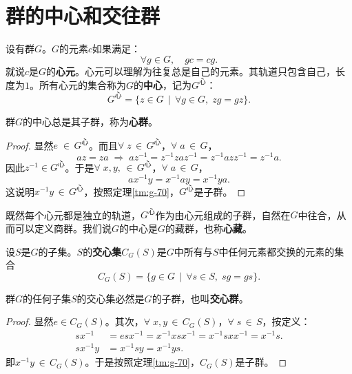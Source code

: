 \documentclass[12pt,UTF8,fontset=none]{ctexbook}
\begin{document}
\section{群的中心和交往群}

设有群$G$。$G$的元素$c$如果满足：
$$ \forall g\in G, \quad gc = cg.$$
就说$c$是$G$的\textbf{心元}。心元可以理解为往复总是自己的元素。其轨道只包含自己，长度为$1$。所有心元的集合称为$G$的\textbf{中心}，记为$G^{\text{心}}$：
$$ G^{\text{心}} = \{z\in G \, \mid \, \forall g\in G, \; zg = gz\}.$$

\begin{tm}\label{tm:g-150}
    群$G$的中心总是其子群，称为\textbf{心群}。
\end{tm}
\begin{proof}
    显然$e\;\in\,G^{\text{心}}$。而且$\forall \; z \,\in\, G^{\text{心}}$，$\forall\; a\,\in\, G$，
    $$ az = za \; \Rightarrow \;az^{-1} = z^{-1}zaz^{-1} = z^{-1}azz^{-1} = z^{-1}a. $$
    因此$z^{-1}\in G^{\text{心}}$。于是$\forall \; x, y,\,\in\, G^{\text{心}}$，$\forall\; a\,\in\, G$，
    $$ ax^{-1}y = x^{-1}ay = x^{-1}ya. $$
    这说明$x^{-1}y \,\in \, G^{\text{心}}$，按照定理\ref{tm:g-70}，$G^{\text{心}}$是子群。
\end{proof}

既然每个心元都是独立的轨道，$G^{\text{心}}$作为由心元组成的子群，自然在$G$中往合，从而可以定义商群。我们说$G$的中心是$G$的藏群，也称\textbf{心藏}。

\begin{df}
    设$S$是$G$的子集。$S$的\textbf{交心集}$C_G(S)$是$G$中所有与$S$中任何元素都交换的元素的集合
    $$ C_G(S) = \{g\in G \, \mid \, \forall s\in S, \; sg = gs\}. $$
\end{df}

\begin{tm}\label{tm:g-160}
    群$G$的任何子集$S$的交心集必然是$G$的子群，也叫\textbf{交心群}。
\end{tm}
\begin{proof}
    显然$e\in C_G(S)$。其次，$\forall \; x, y\,\in\, C_G(S)$，$\forall\; s\,\in\, S$，按定义：
    \begin{align*}
        sx^{-1} &= esx^{-1} = x^{-1}xsx^{-1} = x^{-1}sxx^{-1} = x^{-1}s. \\
        sx^{-1}y &= x^{-1}sy = x^{-1}ys.
    \end{align*}
    即$x^{-1}y \,\in \, C_G(S)$。于是按照定理\ref{tm:g-70}，$C_G(S)$是子群。
\end{proof}
\end{document}
